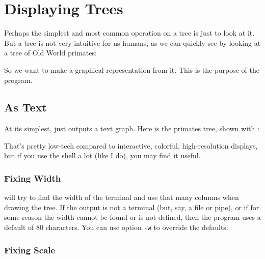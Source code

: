 
\section{Displaying Trees}
\label{sct_display}

Perhaps the simplest and most common operation on a \nw{} tree is just to look
at it. But a \nw{} tree is not very intuitive for us humans, as we can quickly
see by looking \eg{} at a tree of Old World primates:

\begin{samepage}


\end{samepage}

\noindent{}So we want to make a graphical representation from it. This is the
purpose of the \display{} program. 

\subsection{As Text}
\label{sct_display_text}

At its simplest, \display{} just outputs a text graph. Here is the primates tree, shown with \display{}:
\begin{samepage}


\end{samepage}
That's pretty low-tech compared to interactive, colorful, high-resolution displays, but if you use the shell a lot (like I do), you may find it useful.

\subsubsection{Fixing Width}

\display{} will try to find the width of the terminal and
use that many columns when drawing the tree. If the output is not a terminal
(but, say, a file or pipe), or if for some reason the width cannot be found or
is not defined, then the program uses a default of 80 characters. You can use
option \texttt{-w} to override the defaults.

\begin{samepage}


\end{samepage}

\subsubsection{Fixing Scale}

